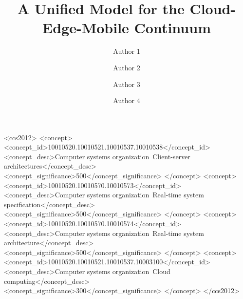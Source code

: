 \documentclass[manuscript, screen]{acmart} %
\begin{document}
\title{A Unified Model for the Cloud-Edge-Mobile Continuum} 

\author{Author 1}
\author{Author 2}
\author{Author 3}
\author{Author 4}

\renewcommand\shortauthors{Baresi, L. et al}

\begin{abstract}
%
\end{abstract}


%
%
\begin{CCSXML}
<ccs2012>
<concept>
<concept_id>10010520.10010521.10010537.10010538</concept_id>
<concept_desc>Computer systems organization~Client-server architectures</concept_desc>
<concept_significance>500</concept_significance>
</concept>
<concept>
<concept_id>10010520.10010570.10010573</concept_id>
<concept_desc>Computer systems organization~Real-time system specification</concept_desc>
<concept_significance>500</concept_significance>
</concept>
<concept>
<concept_id>10010520.10010570.10010574</concept_id>
<concept_desc>Computer systems organization~Real-time system architecture</concept_desc>
<concept_significance>500</concept_significance>
</concept>
<concept>
<concept_id>10010520.10010521.10010537.10003100</concept_id>
<concept_desc>Computer systems organization~Cloud computing</concept_desc>
<concept_significance>300</concept_significance>
</concept>
</ccs2012>
\end{CCSXML}
\end{document}
